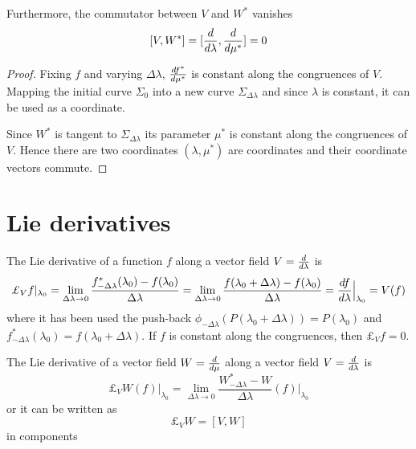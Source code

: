     Furthermore, the commutator between $V$ and $W^*$ vanishes
    \begin{equation}\label{comm}
        [V, W^*] = [\frac{d}{d\lambda}, \frac{d}{d\mu^*}] = 0
    \end{equation}

    \begin{proof}
        Fixing $f$ and varying $\Delta \lambda$, $\frac{df^*}{d\mu^*}$ is constant along the congruences of $V$. Mapping the initial curve $\Sigma_0$ into a new curve $\Sigma_{\Delta \lambda}$ and since $\lambda$ is constant, it can be used as a coordinate. 

        Since $W^*$ is tangent to $\Sigma_{\Delta \lambda}$ its parameter $\mu^*$ is constant along the congruences of $V$. Hence there are two coordinates $(\lambda, \mu^*)$ are coordinates and their coordinate vectors commute.
    \end{proof}

\section{Lie derivatives}

    The Lie derivative of a function $f$ along a vector field $V=\frac{d}{d\lambda}$ is 
    \begin{equation*}
        \pounds_{V} f \vert_{\lambda_0} = \lim_{\Delta \lambda \rightarrow 0} \frac{f^*_{-\Delta \lambda}(\lambda_0) - f(\lambda_0)}{\Delta \lambda} = \lim_{\Delta \lambda \rightarrow 0} \frac{f(\lambda_0 + \Delta \lambda)- f(\lambda_0)}{\Delta \lambda} = \dv{f}{\lambda} \Big \vert_{\lambda_0} = V(f)
    \end{equation*}
    where it has been used the push-back $\phi_{-\Delta\lambda} (P(\lambda_0 + \Delta \lambda)) = P(\lambda_0)$ and $f^*_{-\Delta\lambda} (\lambda_0) = f (\lambda_0 + \Delta \lambda)$. If $f$ is constant along the congruences, then $\pounds_V f = 0$.

    The Lie derivative of a vector field $W=\frac{d}{d\mu}$ along a vector field $V=\frac{d}{d\lambda}$ is
    \begin{equation*}
        \pounds_V W (f) \vert_{\lambda_0} = \lim_{\Delta \lambda \rightarrow 0} \frac{W^*_{-\Delta\lambda} - W}{\Delta \lambda} (f) \Big \vert_{\lambda_0}
    \end{equation*}
    or it can be written as 
    \begin{equation*}
        \pounds_V W = [V, W]
    \end{equation*}
    in components

